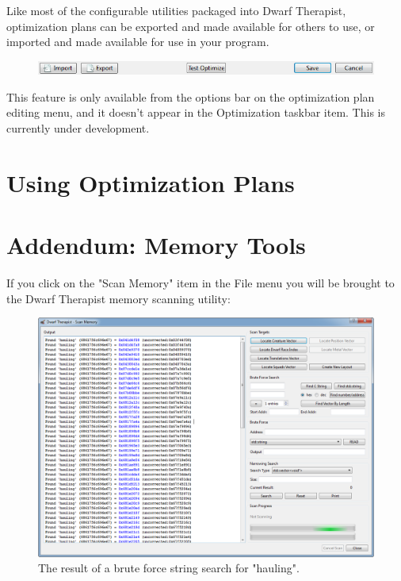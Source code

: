 \documentclass[]{article}
\begin{document}
Like most of the configurable utilities packaged into Dwarf Therapist, optimization plans can be exported
and made available for others to use, or imported and made available for use in your program.

\begin{figure}[h!] \centering \includegraphics[width=\linewidth]{Sec4Fig17}
\end{figure}

This feature is only available from the options bar on the optimization plan editing menu, and it doesn't
appear in the Optimization taskbar item. This is currently under development.

\section{Using Optimization Plans}
\label{Using Optimization Plans}

\newpage
\section{Addendum: Memory Tools}
\label{sec:Scanning Memory}
If you click on the "Scan Memory" item in the File menu you will be brought to the Dwarf Therapist memory
scanning utility:
\begin{figure}[h!] \centering \includegraphics[width=\textwidth]{Sec4FigExtra}
\caption{The result of a brute force string search for "hauling".}
\end{figure}
\end{document}
